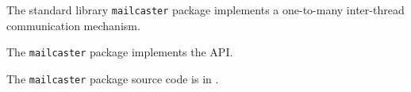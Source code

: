 
The standard library {\tt mailcaster} package implements a one-to-many inter-thread communication mechanism.

The {\tt mailcaster} package implements the  API.

The {\tt mailcaster} package source code is in .



